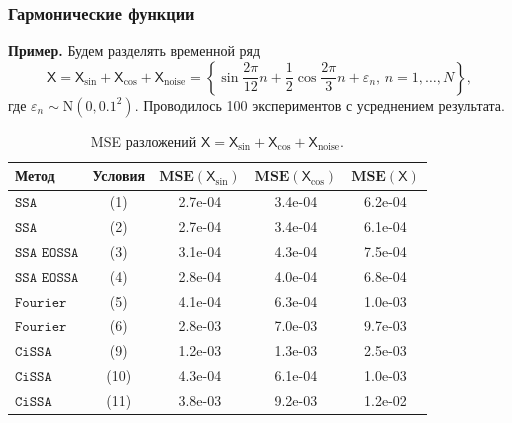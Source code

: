 \documentclass[12pt, specialist, subf
]{disser}
\theoremstyle{definition}
\newcommand{\SSA}{\texttt{SSA}}
\newcommand{\EOSSA}{\texttt{SSA EOSSA}}
\newcommand{\CISSA}{\texttt{CiSSA}}
\newcommand{\FOURIER}{\texttt{Fourier}}
\newcommand{\TS}{\mathsf{X}}
\newcommand{\MSE}{\textbf{MSE}}
\begin{document}
\subsubsection{Гармонические функции}

\textbf{\large{Пример.}} Будем разделять временной ряд 
\[
\TS = \TS_{\sin} + \TS_{\cos} + \TS_{\mathrm{noise}} =  \left\{ \sin{\frac{2\pi}{12}n} + \frac{1}{2}\cos{\frac{2\pi}{3}n}+ \varepsilon_n, \, n = 1, \dots, N \right\},
\]
где $\varepsilon_n \sim \mathrm N(0, 0.1^2)$. Проводилось 100 экспериментов с усреднением результата.

\begin{table}[H]
\centering
\caption{MSE разложений \(\TS = \TS_{\sin} + \TS_{\cos}+ \TS_{\mathrm{noise}}\).}
\label{tab:exact_noised_results}
\begin{tabular}{l|c|ccc}
  \hline
  \textbf{Метод} & \textbf{Условия} & \(\MSE(\TS_{\sin})\) & \(\MSE(\TS_{\cos})\) & \(\MSE(\TS)\) \\ 
  \hline
  $\SSA$    & (1) & 2.7e-04 & 3.4e-04 & 6.2e-04 \\ 
  $\SSA$    & (2) & 2.7e-04 & 3.4e-04 & 6.1e-04 \\ 
  \hline
  $\EOSSA$  & (3) & 3.1e-04 & 4.3e-04 & 7.5e-04 \\ 
  $\EOSSA$  & (4) & 2.8e-04 & 4.0e-04 & 6.8e-04 \\ 
  \hline
  $\FOURIER$    & (5) & 4.1e-04 & 6.3e-04 & 1.0e-03 \\ 
  $\FOURIER$ & (6) & 2.8e-03 & 7.0e-03 & 9.7e-03 \\ 
  \hline
  $\CISSA$  & (9) & 1.2e-03 & 1.3e-03 & 2.5e-03 \\ 
  $\CISSA$ & (10) & 4.3e-04 & 6.1e-04 & 1.0e-03 \\ 
  $\CISSA$ & (11) & 3.8e-03 & 9.2e-03 & 1.2e-02 \\ 
  \hline
\end{tabular}
\end{table}
\end{document}
